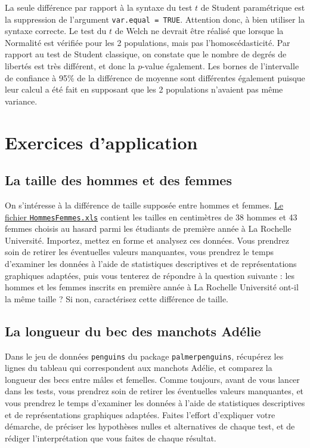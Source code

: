 \documentclass[
  french,
  a4paper,
  DIV=11,
  numbers=noendperiod,
  oneside]{scrreprt}
\begin{document}
La seule différence par rapport à la syntaxe du test \(t\) de Student
paramétrique est la suppression de l'argument
\texttt{var.equal\ =\ TRUE}. Attention donc, à bien utiliser la syntaxe
correcte. Le test du \(t\) de Welch ne devrait être réalisé que lorsque
la Normalité est vérifiée pour les 2 populations, mais pas
l'homoscédasticité. Par rapport au test de Student classique, on
constate que le nombre de degrés de libertés est très différent, et donc
la \(p\)-value également. Les bornes de l'intervalle de confiance à 95\%
de la différence de moyenne sont différentes également puisque leur
calcul a été fait en supposant que les 2 populations n'avaient pas même
variance.

\section{Exercices d'application}\label{exercices-dapplication}

\subsection{La taille des hommes et des
femmes}\label{la-taille-des-hommes-et-des-femmes}

On s'intéresse à la différence de taille supposée entre hommes et
femmes. \href{data/HommesFemmes.xls}{Le fichier
\texttt{HommesFemmes.xls}} contient les tailles en centimètres de 38
hommes et 43 femmes choisis au hasard parmi les étudiants de première
année à La Rochelle Université. Importez, mettez en forme et analysez
ces données. Vous prendrez soin de retirer les éventuelles valeurs
manquantes, vous prendrez le temps d'examiner les données à l'aide de
statistiques descriptives et de représentations graphiques adaptées,
puis vous tenterez de répondre à la question suivante : les hommes et
les femmes inscrits en première année à La Rochelle Université ont-il la
même taille ? Si non, caractérisez cette différence de taille.

\subsection{La longueur du bec des manchots
Adélie}\label{la-longueur-du-bec-des-manchots-aduxe9lie}

Dans le jeu de données \texttt{penguins} du package
\texttt{palmerpenguins}, récupérez les lignes du tableau qui
correspondent aux manchots Adélie, et comparez la longueur des becs
entre mâles et femelles. Comme toujours, avant de vous lancer dans les
tests, vous prendrez soin de retirer les éventuelles valeurs manquantes,
et vous prendrez le temps d'examiner les données à l'aide de
statistiques descriptives et de représentations graphiques adaptées.
Faites l'effort d'expliquer votre démarche, de préciser les hypothèses
nulles et alternatives de chaque test, et de rédiger l'interprétation
que vous faites de chaque résultat.
\end{document}
